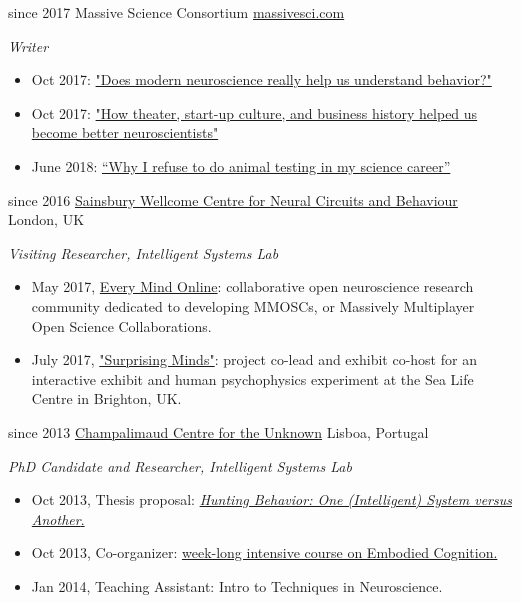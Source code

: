 \documentclass[]{friggeri-cv}
\begin{document}
\begin{entrylist}
  \entry
    {since 2017}
    {Massive Science Consortium}
    {\href{massivesci.com}{massivesci.com}}
    {\emph{Writer}
    \begin{itemize}
    	\item Oct 2017: \href{https://massivesci.com/articles/neuroscience-behavior-vs-technology/}{"Does modern neuroscience really help us understand behavior?"}
    	\item Oct 2017: \href{https://massivesci.com/articles/neuroscience-can-learn-from-theater/}{"How theater, start-up culture, and business history helped us become better neuroscientists"}
    	\item June 2018: \href{https://massivesci.com/articles/frankenstein-kim-animal-testing/}{“Why I refuse to do animal testing in my science career”}
    \end{itemize}
	}
  \entry
    {since 2016}
    {\href{https://www.ucl.ac.uk/swc/}{Sainsbury Wellcome Centre for Neural Circuits and Behaviour}}
    {London, UK}
    {\emph{Visiting Researcher, Intelligent Systems Lab}
    \begin{itemize}
    	\item May 2017, \href{www.everymind.online}{Every Mind Online}: collaborative open neuroscience research community dedicated to developing MMOSCs, or Massively Multiplayer Open Science Collaborations.
    	\item July 2017, \href{http://www.everymind.online/SurprisingMinds/}{"Surprising Minds"}: project co-lead and exhibit co-host for an interactive exhibit and human psychophysics experiment at the Sea Life Centre in Brighton, UK.
    \end{itemize}
	}
  \entry
    {since 2013}
    {\href{http://neuro.fchampalimaud.org/en/research/investigators/research-groups/group/Kampff/}{Champalimaud Centre for the Unknown}}
    {Lisboa, Portugal}
    {\emph{PhD Candidate and Researcher, Intelligent Systems Lab}
    \begin{itemize}
    	\item Oct 2013, Thesis proposal: \href{http://danbeekim.org/phd-thesis-proposal-oct-2013}{\emph{Hunting Behavior: One (Intelligent) System versus Another}.}
    	\item Oct 2013, Co-organizer: \href{https://sites.google.com/a/neuro.fchampalimaud.org/embodied-cognition/course-information/schedule}{week-long intensive course on Embodied Cognition.}
    	\item Jan 2014, Teaching Assistant: Intro to Techniques in Neuroscience.

\end{itemize}}
\end{entrylist}
\end{document}
